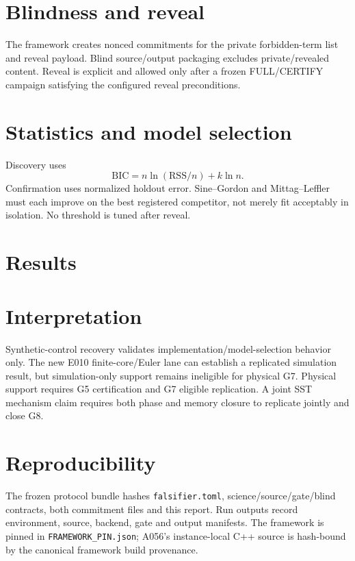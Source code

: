 \documentclass[11pt,a4paper]{article}
\newcommand{\code}[1]{\texttt{#1}}
\begin{document}
\section{Blindness and reveal}
The framework creates nonced commitments for the private forbidden-term list and reveal payload. Blind source/output packaging excludes private/revealed content. Reveal is explicit and allowed only after a frozen FULL/CERTIFY campaign satisfying the configured reveal preconditions.

\section{Statistics and model selection}
Discovery uses
\[
\mathrm{BIC}=n\ln(\mathrm{RSS}/n)+k\ln n.
\]
Confirmation uses normalized holdout error. Sine--Gordon and Mittag--Leffler must each improve on the best registered competitor, not merely fit acceptably in isolation. No threshold is tuned after reveal.

\section{Results}

\section{Interpretation}
Synthetic-control recovery validates implementation/model-selection behavior only. The new E010 finite-core/Euler lane can establish a replicated simulation result, but simulation-only support remains ineligible for physical G7. Physical support requires G5 certification and G7 eligible replication. A joint SST mechanism claim requires both phase and memory closure to replicate jointly and close G8.

\section{Reproducibility}
The frozen protocol bundle hashes \code{falsifier.toml}, science/source/gate/blind contracts, both commitment files and this report. Run outputs record environment, source, backend, gate and output manifests. The framework is pinned in \code{FRAMEWORK\_PIN.json}; A056's instance-local C++ source is hash-bound by the canonical framework build provenance.
\end{document}
